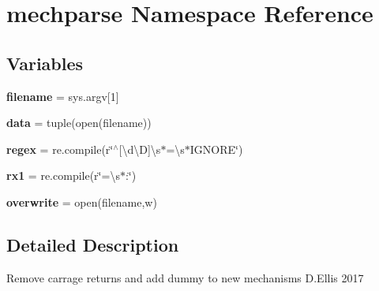 \hypertarget{namespacemechparse}{}\section{mechparse Namespace Reference}
\label{namespacemechparse}
\subsection*{Variables}
\begin{DoxyCompactItemize}
\item 
\mbox{\label{namespacemechparse_a3af8f0abd5c03ad48dd7efc73f1e22b7}} 
{\bfseries filename} = sys.\+argv\mbox{[}1\mbox{]}
\item 
\mbox{\label{namespacemechparse_ab5c8ffd70f1b7fbbac8f114733f7caf5}} 
{\bfseries data} = tuple(open(filename))
\item 
\mbox{\label{namespacemechparse_aa3f3e320612cc8a81168bba423df0876}} 
{\bfseries regex} = re.\+compile(r\char`\"{}$^\wedge$\mbox{[}\textbackslash{}d\textbackslash{}D\mbox{]}\textbackslash{}s$\ast$=\textbackslash{}s$\ast$I\+G\+N\+O\+RE\char`\"{})
\item 
\mbox{\label{namespacemechparse_a24f1a458d37a3aef7f220be2417a49a0}} 
{\bfseries rx1} = re.\+compile(r\char`\"{}=\textbackslash{}s$\ast$\+:\char`\"{})
\item 
\mbox{\label{namespacemechparse_a1eaefcc3a1eff9e776e50b716ea2c12d}} 
{\bfseries overwrite} = open(filename,\textquotesingle{}w\textquotesingle{})
\end{DoxyCompactItemize}


\subsection{Detailed Description}
\begin{DoxyVerb}Remove carrage returns and add dummy to new mechanisms
D.Ellis 2017
\end{DoxyVerb}
 
